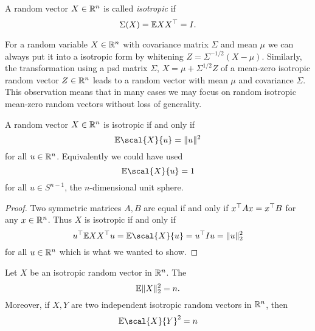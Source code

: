 \documentclass{article}
\begin{document}
\begin{definition}
  A random vector \(X \in \mathbb{R}^{n}\) is called \emph{isotropic} if
  \begin{equation}
    \Sigma(X) = \mathbb{E} X X^\top = I.
  \end{equation}
\end{definition}

For a random variable \(X \in \mathbb{R}^{n}\) with covariance matrix \(\Sigma\) and
mean \(\mu\) we can always put it into a isotropic form by whitening
\(Z = \Sigma^{-1/2}(X - \mu)\). Similarly, the transformation using a psd matrix
\(\Sigma\),
\(X = \mu + \Sigma^{1/2}Z\) of a mean-zero isotropic random vector
\(Z \in \mathbb{R}^{n}\) leads to a random vector with mean \(\mu\) and covariance
\(\Sigma\). This observation means that in many cases we may focus on random
isotropic mean-zero random vectors without loss of generality.

\begin{lemma}
  \label{lem:isotropy-marginal-characterisation}
  A random vector \(X \in \mathbb{R}^{n}\) is isotropic if and only if
  \begin{equation}
    \E \scal{X}{u} = \norm{u}^{2}
  \end{equation}
  for all \(u \in \mathbb{R}^{n}\). Equivalently we could have used
  \begin{equation}
    \E \scal{X}{u} = 1
  \end{equation}
  for all \(u \in S^{n-1}\), the \(n\)-dimensional unit sphere.
\end{lemma}

\begin{proof}
  Two symmetric matrices \(A, B\) are equal if and only if
  \(x^\top A x = x^\top B\) for any \(x \in \mathbb{R}^{n}\). Thus \(X\) is isotropic if
  and only if
  \begin{equation}
    u\tran \E X X\tran u = \E \scal{X}{u} = u\tran I u = \norm{u}_{2}^{2}
  \end{equation}
  for all \(u \in \mathbb{R}^{n}\) which is what we wanted to show.
\end{proof}

\begin{lemma}
  Let \(X\) be an isotropic random vector in \(\mathbb{R}^{n}\). The
  \begin{equation}
    \mathbb{E} \lVert X\rVert^{2}_{2} = n.
  \end{equation}
  Moreover, if \(X, Y\) are two independent isotropic random vectors in
  \(\mathbb{R}^{n}\), then
  \begin{equation}
    \E\scal{X}{Y}^{2} = n
  \end{equation}
\end{lemma}
\end{document}
